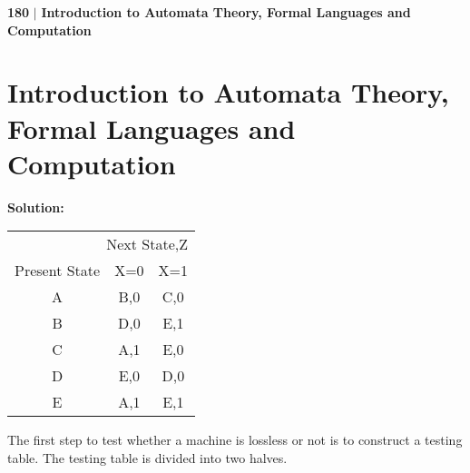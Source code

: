 \documentclass[a4,9pt]{beamer}
\begin{document}
\begin{frame}

\begin{flushleft}
    \textbf{180}\hspace*{0.1cm} \textbf{$|$} \hspace*{0.1cm} {\tiny \textbf{Introduction to Automata Theory, Formal Languages and Computation}}
  \end{flushleft}
\section*{Introduction to Automata Theory, Formal Languages and Computation}

\vspace*{0.1cm}
\pause
\large{\textbf{Solution:}}

\pause
\begin{center}
\begin{tabular}{ccc}
\hline

\hline

\hline

\hline
  \multicolumn{3}{r}{{Next State,Z}}\\
 \cline{2-3}
{Present State} & {X=0} & {X=1}\\
\hline
 A & B,0 & C,0 \\
 B & D,0 & E,1 \\
 C & A,1 & E,0 \\
 D & E,0 & D,0 \\
 E & A,1 & E,1 \\
\hline

\hline

\hline

\hline
\end{tabular}
\end{center}

\pause
The first step to test whether a machine is lossless or not is to construct a testing table. The testing table is divided into two halves.
\end{frame}
\end{document}
